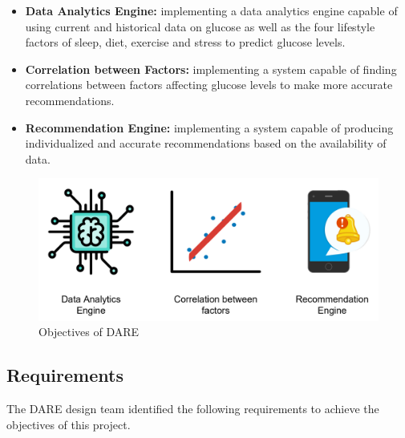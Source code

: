\begin{itemize}
    \item \textbf{Data Analytics Engine:} implementing a data analytics engine capable of using current and historical data on glucose as well as the four lifestyle factors of sleep, diet, exercise and stress to predict glucose levels.
    \item \textbf{Correlation between Factors:} implementing a system capable of finding correlations between factors affecting glucose levels to make more accurate recommendations.
    \item \textbf{Recommendation Engine:} implementing a system capable of producing individualized and accurate recommendations based on the availability of data.
\end{itemize}

\begin{figure}[h!]
    \centering
    \includegraphics[width=\textwidth]{Figures/pooria/obj.png}
    \caption{Objectives of DARE}
\end{figure}



\subsection{Requirements}
\label{subsec:requirements}
The DARE design team identified the following requirements to achieve the objectives of this project.
\bigbreak
